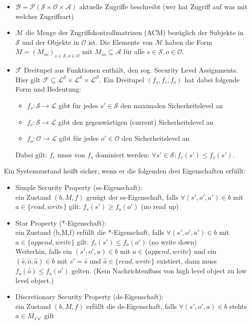 \documentclass[a4paper,twoside,DIV15,BCOR12mm]{scrbook}
\begin{document}
\begin{itemize}
	\item $\mathcal{B} = \mathcal{P}(\mathcal{S} \times \mathcal{O} \times \mathcal{A})$ aktuelle Zugriffe beschreibt (wer hat Zugriff auf was mit welcher Zugriffsart)
	\item $\mathcal{M}$ die Menge der Zugriffskontrollmatrizen (ACM) bezüglich der Subjekte in $\mathcal{S}$ und der Objekte in $\mathcal{O}$ ist. Die Elemente von $\mathcal{M}$ haben die Form $M = (M_{so})_{s \in \mathcal{S}, o \in \mathcal{O}}$ mit $M_{so} \subseteq \mathcal{A}$ für alle $s \in \mathcal{S}, o \in \mathcal{O}$.
	\item $\mathcal{F}$ Dreitupel aus Funktionen enthält, den sog. Security Level Assignments. Hier gilt $\mathcal{F} \subseteq \mathcal{L}^\mathcal{S} \times \mathcal{L}^\mathcal{S} \times \mathcal{L}^\mathcal{O}$. Ein Dreitupel $(f_s, f_c, f_o)$ hat dabei folgende Form und Bedeutung:
		\begin{itemize}
			\item $f_s \colon \mathcal{S} \rightarrow \mathcal{L}$ gibt für jedes $s' \in \mathcal{S}$ den maximalen Sicherheitslevel an
			\item $f_c \colon \mathcal{S} \rightarrow \mathcal{L}$ gibt den gegenwärtigen (current) Sicherheitslevel an
			\item $f_o \colon \mathcal{O} \rightarrow \mathcal{L}$ gibt für jedes $o' \in \mathcal{O}$ den Sicherheitslevel an
		\end{itemize}
		Dabei gilt: $f_c$ muss von $f_s$ dominiert werden: $\forall s' \in \mathcal{S} \colon f_c(s') \leq f_s(s')$.
\end{itemize}

Ein Systemzustand heißt sicher, wenn er die folgenden drei Eigenschaften erfüllt:

\begin{itemize}
	\item Simple Security Property (ss-Eigenschaft):\\ ein Zustand $(b,M,f)$ genügt der ss-Eigenschaft, falls $\forall (s',o',a') \in b$ mit $a \in \{read, write\}$ gilt: $f_s(s') \geq f_o(o')$ (\glqq no read up\grqq)
	\item Star Property (*-Eigenschaft):\\ ein Zustand (b,M,f) erfüllt die *-Eigenschaft, falls $\forall (s',o',a') \in b$ mit $a \in \{append, write\}$ gilt: $f_c(s') \leq f_o(o')$ (\glqq no write down\grqq)\\ Weiterhin, falls ein $(s', o',a) \in b$ mit $a \in \{append, write\}$ und ein $(\hat s, \hat o, \hat a) \in b$ mit $s' = \hat s$ und $\hat a \in \{read, write\}$ existiert, dann muss $f_o(\hat o) \leq f_o(o')$ gelten. (\glqq Kein Nachrichtenfluss von high level object zu low level object.\grqq)
	\item Discretionary Security Property (ds-Eigenschaft):\\ ein Zustand $(b,M,f)$ erfüllt die ds-Eigenschaft, falls $\forall (s',o',a) \in b$ stehts $a \in M_{s'o'}$ gilt
\end{itemize}
\end{document}
